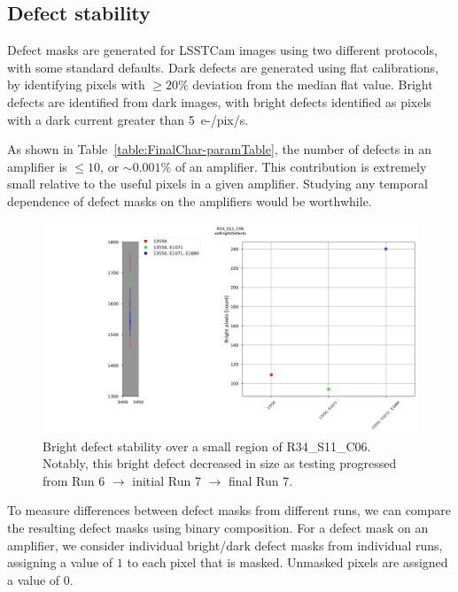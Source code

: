 \subsection{Defect stability}\label{defect-stability}

Defect masks are generated for LSSTCam images using two different protocols, with some standard defaults. Dark defects are generated using flat calibrations, by identifying pixels with $\geq 20\%$ deviation from the median flat value. Bright defects are identified from dark images, with bright defects identified as pixels with a dark current greater than 5 \,e-/pix/s.

As shown in Table~\ref{table:FinalChar-paramTable}, the number of defects in an amplifier is $\leq 10$, or $\sim0.001 \%$ of an amplifier. This contribution is extremely small relative to the useful pixels in a given amplifier. Studying any temporal dependence of defect masks on the amplifiers would be worthwhile.  %

\begin{figure}[ht]
    \centering
    \includegraphics[width=\linewidth]{figures/R34_S11_C06(1).jpg}
    \caption{Bright defect stability over a small region of R34\_S11\_C06. Notably, this bright defect decreased in size as testing progressed from Run 6 $\rightarrow$ initial Run 7 $\rightarrow$ final Run 7.}
    \label{fig:BrightDefectStability}
\end{figure}

To measure differences between defect masks from different runs, we can compare the resulting defect masks using binary composition. For a defect mask on an amplifier, we consider individual bright/dark defect masks from individual runs, assigning a value of $1$ to each pixel that is masked. Unmasked pixels are assigned a value of $0$.


